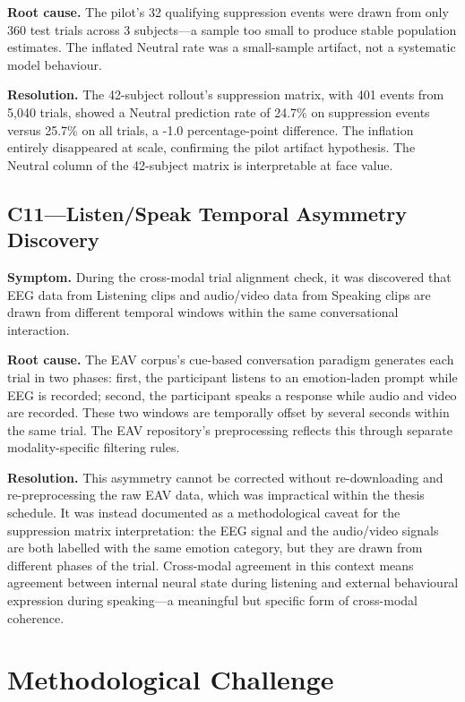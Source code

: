 \textbf{Root cause.} The pilot's 32 qualifying suppression events were drawn from only 360 test trials across 3 subjects---a sample too small to produce stable population estimates. The inflated Neutral rate was a small-sample artifact, not a systematic model behaviour.

\textbf{Resolution.} The 42-subject rollout's suppression matrix, with 401 events from 5,040 trials, showed a Neutral prediction rate of 24.7\% on suppression events versus 25.7\% on all trials, a -1.0 percentage-point difference. The inflation entirely disappeared at scale, confirming the pilot artifact hypothesis. The Neutral column of the 42-subject matrix is interpretable at face value.

\subsection*{C11---Listen/Speak Temporal Asymmetry Discovery}
\label{sec:listenspeak_asymmetry}
\textbf{Symptom.} During the cross-modal trial alignment check, it was discovered that EEG data from Listening clips and audio/video data from Speaking clips are drawn from different temporal windows within the same conversational interaction.

\textbf{Root cause.} The EAV corpus's cue-based conversation paradigm generates each trial in two phases: first, the participant listens to an emotion-laden prompt while EEG is recorded; second, the participant speaks a response while audio and video are recorded. These two windows are temporally offset by several seconds within the same trial. The EAV repository's preprocessing reflects this through separate modality-specific filtering rules.

\textbf{Resolution.} This asymmetry cannot be corrected without re-downloading and re-preprocessing the raw EAV data, which was impractical within the thesis schedule. It was instead documented as a methodological caveat for the suppression matrix interpretation: the EEG signal and the audio/video signals are both labelled with the same emotion category, but they are drawn from different phases of the trial. Cross-modal agreement in this context means agreement between internal neural state during listening and external behavioural expression during speaking---a meaningful but specific form of cross-modal coherence.

\section{Methodological Challenge}
